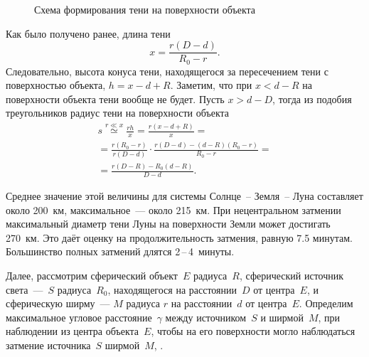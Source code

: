 \begin{figure}[h!]
    \caption{Схема формирования тени на поверхности объекта}
    \label{pic:shadow-size-on-surface}    
\end{figure}

Как было получено ранее, длина тени
\begin{equation*}
    x = \frac{r (D - d)}{R_0 - r}.
\end{equation*}
Следовательно, высота конуса тени, находящегося за пересечением тени с поверхностью объекта, $h = x - d + R$. Заметим, что при $x < d - R$ на поверхности объекта тени вообще не будет. Пусть $x > d - D$, тогда из подобия треугольников радиус тени на поверхности объекта
\begin{multline}
    s 
        \overset{r \ll x}{\simeq} \frac{r h}{x} 
        = \frac{r(x - d + R)}{x} = \\
        = \frac{r (R_0 - r)}{r (D - d)} \cdot \frac{r(D - d) - (d - R)(R_0 - r)}{R_0 - r} = \\
        = \frac{r (D - R) - R_0 (d - R)}{D - d}.
\end{multline}

Среднее значение этой величины для системы Солнце~-- Земля~-- Луна составляет около 200~км, максимальное~--- около 215~км. При нецентральном затмении максимальный диаметр тени Луны на поверхности Земли может достигать 270~км. Это даёт оценку на продолжительность затмения, равную 7.5 минутам. Большинство полных затмений длятся 2\,--\,4~минуты.

Далее, рассмотрим сферический объект~$E$ радиуса~$R$, сферический источник света~---~$S$ радиуса~$R_0$, находящегося на расстоянии~$D$ от центра~$E$, и сферическую ширму~--- $M$ радиуса $r$ на расстоянии~$d$ от центра~$E$. Определим максимальное угловое расстояние~$\gamma$ между источником~$S$ и ширмой~$M$, при наблюдении из центра объекта~$E$, чтобы на его поверхности могло наблюдаться затмение источника~$S$ ширмой~$M$, .


